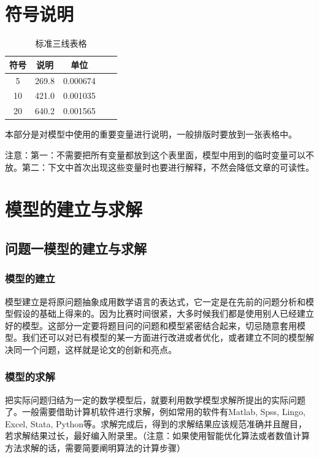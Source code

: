 \documentclass[withoutpreface,bwprint]{cumcmthesis} %
\begin{document}
\section{符号说明}

\begin{table}[!htbp]
    \caption{标准三线表格}\label{tab:001} \centering
    \begin{tabular}{ccccc}
        \toprule[1.5pt]
        符号 & 说明 & 单位\\
        \midrule[1pt]
        5 & 269.8 & 0.000674\\
        10 & 421.0 & 0.001035\\
        20 & 640.2 & 0.001565\\
        \bottomrule[1.5pt]
    \end{tabular}
\end{table}

本部分是对模型中使用的重要变量进行说明，一般排版时要放到一张表格中。

注意：第一：不需要把所有变量都放到这个表里面，模型中用到的临时变量可以不放。第二：下文中首次出现这些变量时也要进行解释，不然会降低文章的可读性。

\section{模型的建立与求解}

\subsection{问题一模型的建立与求解}

\subsubsection{模型的建立}

模型建立是将原问题抽象成用数学语言的表达式，它一定是在先前的问题分析和模型假设的基础上得来的。因为比赛时间很紧，大多时候我们都是使用别人已经建立好的模型。这部分一定要将题目问的问题和模型紧密结合起来，切忌随意套用模型。我们还可以对已有模型的某一方面进行改进或者优化，或者建立不同的模型解决同一个问题，这样就是论文的创新和亮点。

\subsubsection{模型的求解}

把实际问题归结为一定的数学模型后，就要利用数学模型求解所提出的实际问题了。一般需要借助计算机软件进行求解，例如常用的软件有Matlab, Spss, Lingo, Excel, Stata, Python等。求解完成后，得到的求解结果应该规范准确并且醒目，若求解结果过长，最好编入附录里。（注意：如果使用智能优化算法或者数值计算方法求解的话，需要简要阐明算法的计算步骤）
\end{document}
